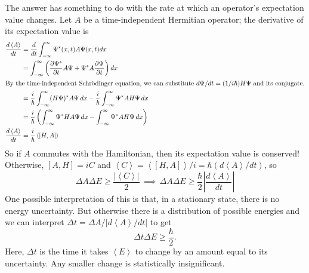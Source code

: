 \documentclass[../p052main.tex]{subfiles}
\begin{document}
The answer has something to do with the rate at which an operator's expectation value changes.
Let $A$ be a time-independent Hermitian operator; the derivative of its expectation value is
\begin{align*}
    \frac{d \left< A \right>}{dt} &= \frac{d}{dt} \int_{-\infty}^{\infty} \Psi^*(x,t) A \Psi (x,t) dx \\
    &= \int_{-\infty}^{\infty} \left( \frac{\partial \Psi^*}{\partial t} A \Psi + \Psi^* A \frac{\partial \Psi}{\partial t} \right) dx \\
    \intertext{By the time-independent Schrödinger equation, we can substitute $d\Psi / dt = (1 / i\hbar) H \Psi$ and its conjugate.}
    &= \frac{i}{\hbar} \int_{-\infty}^{\infty} (H \Psi)^* A \Psi \,dx - \frac{i}{\hbar} \int_{-\infty}^{\infty} \Psi^* A H \Psi \,dx \\
    &= \frac{i}{\hbar} \left( \int_{-\infty}^{\infty} \Psi^* H A \Psi \,dx - \int_{-\infty}^{\infty} \Psi^* A H \Psi \,dx \right) \\
    \frac{d \left< A \right>}{dt} &= \frac{i}{\hbar} \left< [H, A] \right>
\end{align*}
So if $A$ commutes with the Hamiltonian, then its expectation value is conserved!
Otherwise, $[A, H] = iC$ and $\left< C \right> = \left< [H, A] \right> / i = \hbar (d \left< A \right> / dt)$, so
\[ \Delta A \Delta E \geq \frac{|\left< C \right>|}{2} \,\implies\, \Delta A \Delta E \geq \frac{\hbar}{2} \left| \frac{d \left< A \right>}{dt} \right| \]
One possible interpretation of this is that, in a stationary state, there is no energy uncertainty.
But otherwise there is a distribution of possible energies and we can interpret
$\Delta t = \Delta A / |d \left< A \right> / dt|$ to get
\[ \Delta t \Delta E \geq \frac{\hbar}{2}. \]
Here, $\Delta t$ is the time it takes $\left< E \right>$ to change by an amount equal to its uncertainty.
Any smaller change is statistically insignificant.

\end{document}

